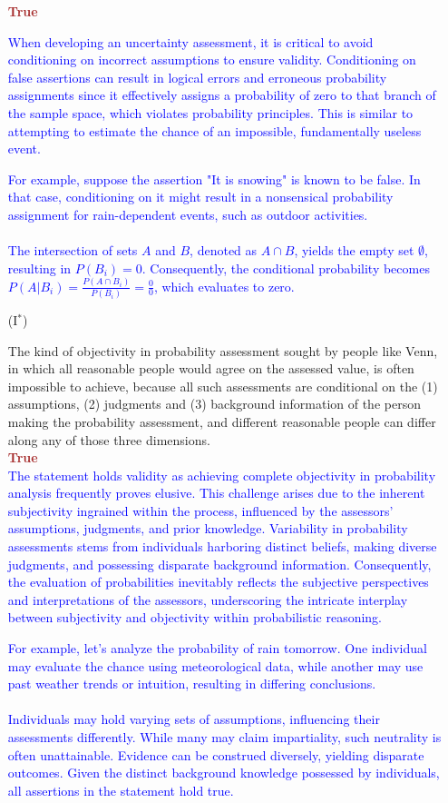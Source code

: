 \documentclass[12pt]{article}
\begin{document}
\begin{itemize}
\textcolor{brown}{\textbf{True}}

\textcolor{blue}{When developing an uncertainty assessment, it is critical to avoid conditioning on incorrect assumptions to ensure validity. Conditioning on false assertions can result in logical errors and erroneous probability assignments since it effectively assigns a probability of zero to that branch of the sample space, which violates probability principles. This is similar to attempting to estimate the chance of an impossible, fundamentally useless event.}

\textcolor{blue}{For example, suppose the assertion "It is snowing" is known to be false. In that case, conditioning on it might result in a nonsensical probability assignment for rain-dependent events, such as outdoor activities.
\\ \\
The intersection of sets \( A \) and \( B \), denoted as \( A \cap B \), yields the empty set \( \emptyset \), resulting in \( P(B_i) = 0 \). Consequently, the conditional probability becomes \( P(A | B_i) = \frac{P(A \cap B_i)}{P(B_i)} = \frac{0}{0} \), which evaluates to zero.
}


\item[(I$^*$)]

The kind of objectivity in probability assessment sought by people like
Venn, in which all reasonable people would agree on the assessed value, is
often impossible to achieve, because all such assessments are conditional
on the (1) assumptions, (2) judgments and (3) background information of the
person making the probability assessment, and different reasonable people
can differ along any of those three dimensions.\\
\textcolor{brown}{\textbf{True}} \\
\textcolor{blue}{The statement holds validity as achieving complete objectivity in probability analysis frequently proves elusive. This challenge arises due to the inherent subjectivity ingrained within the process, influenced by the assessors' assumptions, judgments, and prior knowledge. Variability in probability assessments stems from individuals harboring distinct beliefs, making diverse judgments, and possessing disparate background information. Consequently, the evaluation of probabilities inevitably reflects the subjective perspectives and interpretations of the assessors, underscoring the intricate interplay between subjectivity and objectivity within probabilistic reasoning.}

\textcolor{blue}{For example, let's analyze the probability of rain tomorrow. One individual may evaluate the chance using meteorological data, while another may use past weather trends or intuition, resulting in differing conclusions. \\ \\ Individuals may hold varying sets of assumptions, influencing their assessments differently. While many may claim impartiality, such neutrality is often unattainable. Evidence can be construed diversely, yielding disparate outcomes. Given the distinct background knowledge possessed by individuals, all assertions in the statement hold true.}



\end{itemize}
\end{document}
